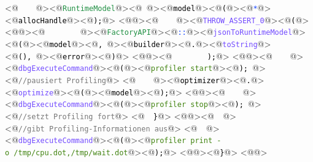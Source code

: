 <@\textcolor[HTML]{000000}{\texttt{\ \ \ \ }}@><@\textcolor[HTML]{1F8F42}{\texttt{RuntimeModel}}@><@\textcolor[HTML]{000000}{\texttt{\ }}@><@\textcolor[HTML]{000000}{\texttt{model}}@><@\textcolor[HTML]{000000}{\texttt{(}}@><@\textcolor[HTML]{1041FF}{\texttt{*}}@><@\textcolor[HTML]{000000}{\texttt{allocHandle}}@><@\textcolor[HTML]{000000}{\texttt{);}}@>
<@\textcolor[HTML]{000000}{\texttt{}}@><@\textcolor[HTML]{000000}{\texttt{\ \ \ \ }}@><@\textcolor[HTML]{724BFF}{\texttt{THROW\_ASSERT\_0}}@><@\textcolor[HTML]{000000}{\texttt{(}}@>
<@\textcolor[HTML]{000000}{\texttt{}}@><@\textcolor[HTML]{000000}{\texttt{\ \ \ \ \ \ \ \ }}@><@\textcolor[HTML]{1F8F42}{\texttt{FactoryAPI}}@><@\textcolor[HTML]{1041FF}{\texttt{::}}@><@\textcolor[HTML]{724BFF}{\texttt{jsonToRuntimeModel}}@><@\textcolor[HTML]{000000}{\texttt{(}}@><@\textcolor[HTML]{000000}{\texttt{model}}@><@\textcolor[HTML]{000000}{\texttt{,\ }}@><@\textcolor[HTML]{000000}{\texttt{builder}}@><@\textcolor[HTML]{000000}{\texttt{.}}@><@\textcolor[HTML]{724BFF}{\texttt{toString}}@><@\textcolor[HTML]{000000}{\texttt{(),\ }}@><@\textcolor[HTML]{000000}{\texttt{error}}@><@\textcolor[HTML]{000000}{\texttt{)}}@>
<@\textcolor[HTML]{000000}{\texttt{}}@><@\textcolor[HTML]{000000}{\texttt{\ \ \ \ \ \ \ \ );}}@>
<@\textcolor[HTML]{000000}{\texttt{}}@><@\textcolor[HTML]{000000}{\texttt{\ \ \ \ }}@><@\textcolor[HTML]{724BFF}{\texttt{dbgExecuteCommand}}@><@\textcolor[HTML]{000000}{\texttt{(}}@><@\textcolor[HTML]{418310}{\texttt{\dq{}profiler\ start\dq{}}}@><@\textcolor[HTML]{000000}{\texttt{);\ }}@><@\textcolor[HTML]{777777}{\texttt{//pausiert\ Profiling}}@>
<@\textcolor[HTML]{000000}{\texttt{\ \ \ \ }}@><@\textcolor[HTML]{000000}{\texttt{optimizer}}@><@\textcolor[HTML]{000000}{\texttt{.}}@><@\textcolor[HTML]{724BFF}{\texttt{optimize}}@><@\textcolor[HTML]{000000}{\texttt{(}}@><@\textcolor[HTML]{000000}{\texttt{model}}@><@\textcolor[HTML]{000000}{\texttt{);}}@>
<@\textcolor[HTML]{000000}{\texttt{}}@><@\textcolor[HTML]{000000}{\texttt{\ \ \ \ }}@><@\textcolor[HTML]{724BFF}{\texttt{dbgExecuteCommand}}@><@\textcolor[HTML]{000000}{\texttt{(}}@><@\textcolor[HTML]{418310}{\texttt{\dq{}profiler\ stop\dq{}}}@><@\textcolor[HTML]{000000}{\texttt{);\ }}@><@\textcolor[HTML]{777777}{\texttt{//setzt\ Profiling\ fort}}@>
<@\textcolor[HTML]{000000}{\texttt{\ \ \}}}@>
<@\textcolor[HTML]{000000}{\texttt{}}@><@\textcolor[HTML]{000000}{\texttt{\ \ }}@><@\textcolor[HTML]{777777}{\texttt{//gibt\ Profiling-Informationen\ aus}}@>
<@\textcolor[HTML]{000000}{\texttt{\ \ }}@><@\textcolor[HTML]{724BFF}{\texttt{dbgExecuteCommand}}@><@\textcolor[HTML]{000000}{\texttt{(}}@><@\textcolor[HTML]{418310}{\texttt{\dq{}profiler\ print\ -o\ /tmp/cpu.dot,/tmp/wait.dot\dq{}}}@><@\textcolor[HTML]{000000}{\texttt{);}}@>
<@\textcolor[HTML]{000000}{\texttt{}}@><@\textcolor[HTML]{000000}{\texttt{\}}}@>
<@\textcolor[HTML]{000000}{\texttt{}}@>